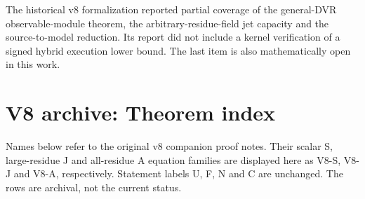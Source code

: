 \documentclass[
  11pt,
]{article}
\begin{document}
The historical v8 formalization reported partial coverage of the
general-DVR observable-module theorem, the arbitrary-residue-field jet
capacity and the source-to-model reduction. Its report did not include
a kernel verification of a signed hybrid execution lower bound. The last item is also mathematically
open in this work.

\section{V8 archive: Theorem index}\label{v8-section-theorem-index}

Names below refer to the original v8 companion proof notes. Their scalar S, large-residue J and all-residue A equation families are displayed here as V8-S, V8-J and V8-A, respectively. Statement labels U, F, N and C are unchanged. The rows are archival, not the current status.
\end{document}

